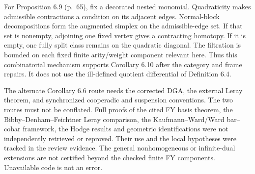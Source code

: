 \documentclass[10pt]{article}
\begin{document}
For Proposition 6.9 (p. 65), fix a decorated nested monomial. Quadraticity makes admissible contractions a condition on its adjacent edges. Normal-block decompositions form the augmented simplex on the admissible-edge set. If that set is nonempty, adjoining one fixed vertex gives a contracting homotopy. If it is empty, one fully split class remains on the quadratic diagonal. The filtration is bounded on each fixed finite arity/weight component relevant here. Thus this combinatorial mechanism supports Corollary 6.10 after the category and frame repairs. It does not use the ill-defined quotient differential of Definition 6.4.\par
The alternate Corollary 6.6 route needs the corrected DGA, the external Leray theorem, and synchronized cooperadic and suspension conventions. The two routes must not be conflated. Full proofs of the cited FY basis theorem, the Bibby–Denham–Feichtner Leray comparison, the Kaufmann–Ward/Ward bar–cobar framework, the Hodge results and geometric identifications were not independently retrieved or reproved. Their use and the local hypotheses were tracked in the review evidence. The general nonhomogeneous or infinite-dual extensions are not certified beyond the checked finite FY components. Unavailable code is not an error.\par
\end{document}
